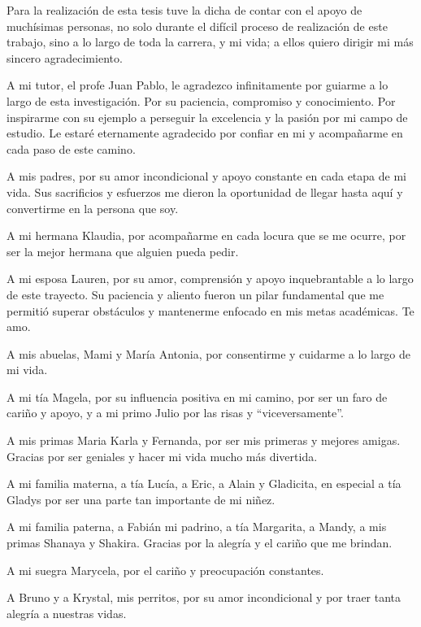 \begin{acknowledgements}
    Para la realizaci\'on de esta tesis tuve la dicha de contar con el apoyo de much\'isimas personas, no solo durante
    el dif\'icil proceso de realizaci\'on de este trabajo, sino a lo largo de toda la carrera, y mi vida; a ellos quiero
    dirigir mi m\'as sincero agradecimiento.

    A mi tutor, el profe Juan Pablo, le agradezco infinitamente por guiarme a lo largo de esta investigaci\'on.
    Por su paciencia, compromiso y conocimiento. Por inspirarme con su ejemplo a perseguir la excelencia y la pasi\'on 
    por mi campo de estudio. Le estar\'e eternamente agradecido por confiar en mi y acompa\~narme en cada paso de este camino.

    A mis padres, por su amor incondicional y apoyo constante en cada etapa de mi vida. Sus sacrificios y esfuerzos me dieron la 
    oportunidad de llegar hasta aqu\'i y convertirme en la persona que soy.

    A mi hermana Klaudia, por acompa\~narme en cada locura que se me ocurre, por ser la mejor hermana que alguien pueda pedir.

    A mi esposa Lauren, por su amor, comprensi\'on y apoyo inquebrantable a lo largo de este trayecto. Su paciencia y aliento fueron 
    un pilar fundamental que me permiti\'o superar obst\'aculos y mantenerme enfocado en mis metas acad\'emicas. Te amo.

    A mis abuelas, Mami y Mar\'ia Antonia, por consentirme y cuidarme a lo largo de mi vida. 

    A mi t\'ia Magela, por su influencia positiva en mi camino, por ser un faro de cari\~no y apoyo, y a mi primo Julio por las risas y ``viceversamente''.
    
    A mis primas Maria Karla y Fernanda, por ser mis primeras y mejores amigas. Gracias por ser geniales y hacer mi vida mucho más divertida.

    A mi familia materna, a t\'ia Luc\'ia, a Eric, a Alain y Gladicita, en especial a t\'ia Gladys por ser una parte tan importante de mi ni\~nez.

    A mi familia paterna, a Fabi\'an mi padrino, a t\'ia Margarita, a Mandy, a mis primas Shanaya y Shakira. Gracias por la alegr\'ia y el cari\~no que me brindan. 

    A mi suegra Marycela, por el cari\~no y preocupaci\'on constantes.

    A Bruno y a Krystal, mis perritos, por su amor incondicional y por traer tanta alegr\'ia a nuestras vidas.


\end{acknowledgements}
